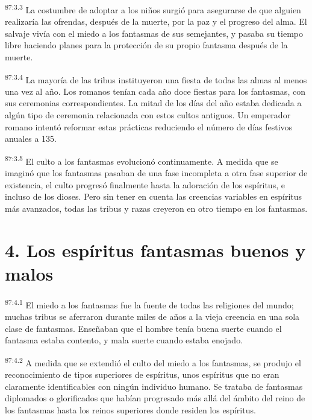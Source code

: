\par
\textsuperscript{87:3.3} La costumbre de adoptar a los niños surgió para asegurarse de que alguien realizaría las ofrendas, después de la muerte, por la paz y el progreso del alma. El salvaje vivía con el miedo a los fantasmas de sus semejantes, y pasaba su tiempo libre haciendo planes para la protección de su propio fantasma después de la muerte.

\par
\textsuperscript{87:3.4} La mayoría de las tribus instituyeron una fiesta de todas las almas al menos una vez al año. Los romanos tenían cada año doce fiestas para los fantasmas, con sus ceremonias correspondientes. La mitad de los días del año estaba dedicada a algún tipo de ceremonia relacionada con estos cultos antiguos. Un emperador romano intentó reformar estas prácticas reduciendo el número de días festivos anuales a 135.

\par
\textsuperscript{87:3.5} El culto a los fantasmas evolucionó continuamente. A medida que se imaginó que los fantasmas pasaban de una fase incompleta a otra fase superior de existencia, el culto progresó finalmente hasta la adoración de los espíritus, e incluso de los dioses. Pero sin tener en cuenta las creencias variables en espíritus más avanzados, todas las tribus y razas creyeron en otro tiempo en los fantasmas.

\section*{4. Los espíritus fantasmas buenos y malos}
\par
\textsuperscript{87:4.1} El miedo a los fantasmas fue la fuente de todas las religiones del mundo; muchas tribus se aferraron durante miles de años a la vieja creencia en una sola clase de fantasmas. Enseñaban que el hombre tenía buena suerte cuando el fantasma estaba contento, y mala suerte cuando estaba enojado.

\par
\textsuperscript{87:4.2} A medida que se extendió el culto del miedo a los fantasmas, se produjo el reconocimiento de tipos superiores de espíritus, unos espíritus que no eran claramente identificables con ningún individuo humano. Se trataba de fantasmas diplomados o glorificados que habían progresado más allá del ámbito del reino de los fantasmas hasta los reinos superiores donde residen los espíritus.

